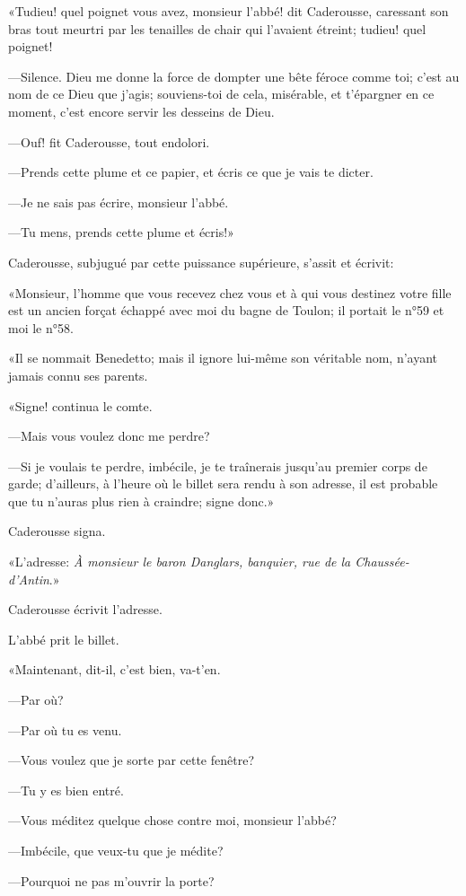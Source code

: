 «Tudieu! quel poignet vous avez, monsieur l'abbé! dit Caderousse, caressant son bras tout meurtri par les tenailles de chair qui l'avaient étreint; tudieu! quel poignet! 

—Silence. Dieu me donne la force de dompter une bête féroce comme toi; c'est au nom de ce Dieu que j'agis; souviens-toi de cela, misérable, et t'épargner en ce moment, c'est encore servir les desseins de Dieu. 

—Ouf! fit Caderousse, tout endolori. 

—Prends cette plume et ce papier, et écris ce que je vais te dicter. 

—Je ne sais pas écrire, monsieur l'abbé. 

—Tu mens, prends cette plume et écris!» 

Caderousse, subjugué par cette puissance supérieure, s'assit et écrivit: 

«Monsieur, l'homme que vous recevez chez vous et à qui vous destinez votre fille est un ancien forçat échappé avec moi du bagne de Toulon; il portait le n°59 et moi le n°58. 

«Il se nommait Benedetto; mais il ignore lui-même son véritable nom, n'ayant jamais connu ses parents. 

«Signe! continua le comte. 

—Mais vous voulez donc me perdre? 

—Si je voulais te perdre, imbécile, je te traînerais jusqu'au premier corps de garde; d'ailleurs, à l'heure où le billet sera rendu à son adresse, il est probable que tu n'auras plus rien à craindre; signe donc.» 

Caderousse signa. 

«L'adresse: \textit{À monsieur le baron Danglars, banquier, rue de la Chaussée-d'Antin}.» 

Caderousse écrivit l'adresse. 

L'abbé prit le billet. 

«Maintenant, dit-il, c'est bien, va-t'en. 

—Par où? 

—Par où tu es venu. 

—Vous voulez que je sorte par cette fenêtre? 

—Tu y es bien entré. 

—Vous méditez quelque chose contre moi, monsieur l'abbé? 

—Imbécile, que veux-tu que je médite? 

—Pourquoi ne pas m'ouvrir la porte? 

